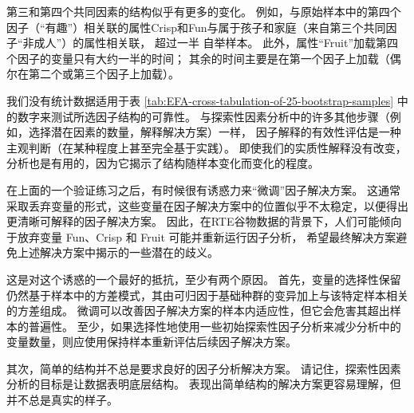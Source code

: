 第三和第四个共同因素的结构似乎有更多的变化。
例如，与原始样本中的第四个因子（“有趣”）相关联的属性Crisp和Fun与属于孩子和家庭（来自第三个共同因子“非成人”）的属性相关联，
超过一半 自举样本。 此外，属性“Fruit”加载第四个因子的变量只有大约一半的时间；
其余的时间主要是在第一个因子上加载（偶尔在第二个或第三个因子上加载）。

我们没有统计数据适用于表 \ref{tab:EFA-cross-tabulation-of-25-bootstrap-samples} 中的数字来测试所选因子结构的可靠性。
与探索性因素分析中的许多其他步骤（例如，选择潜在因素的数量，解释解决方案）一样，
因子解释的有效性评估是一种主观判断（在某种程度上甚至完全基于实践）。
即使我们的实质性解释没有改变，分析也是有用的，因为它揭示了结构随样本变化而变化的程度。

在上面的一个验证练习之后，有时候很有诱惑力来“微调”因子解决方案。
这通常采取丢弃变量的形式，这些变量在因子解决方案中的位置似乎不太稳定，以便得出更清晰可解释的因子解决方案。
因此，在RTE谷物数据的背景下，人们可能倾向于放弃变量 Fun、Crisp 和 Fruit 可能并重新运行因子分析，
希望最终解决方案避免上述解决方案中揭示的一些潜在的歧义。

这是对这个诱惑的一个最好的抵抗，至少有两个原因。
首先，变量的选择性保留仍然基于样本中的方差模式，其由可归因于基础种群的变异加上与该特定样本相关的方差组成。
微调可以改善因子解决方案的样本内适应性，但它会危害其超出样本的普遍性。
至少，如果选择性地使用一些初始探索性因子分析来减少分析中的变量数量，则应使用保持样本重新评估后续因子解决方案。

其次，简单的结构并不总是要求良好的因子分析解决方案。
请记住，探索性因素分析的目标是让数据表明底层结构。
表现出简单结构的解决方案更容易理解，但并不总是真实的样子。